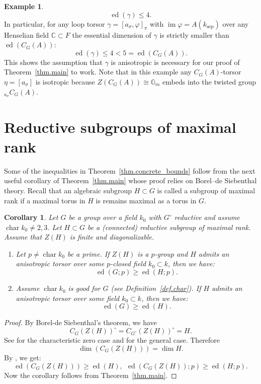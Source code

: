 \documentclass[12pt]{amsart}
\numberwithin{equation}{section}
\newtheorem{corollary}[theorem]{Corollary}
\theoremstyle{definition}
\newtheorem{example}[theorem]{Example}
\newcommand{\bC}{\mathbb{C}}
\newcommand{\Gm}{\mathbb{G}_m}
\newcommand{\im}{\operatorname{im}}
\newcommand{\ed}{\operatorname{ed}}
\newcommand{\sep}{\operatorname{sep}}
\newcommand{\Char}{\operatorname{char}}
\newcommand{\ksep}{k_{\sep}}
\newcommand{\vphi}{\varphi}
\begin{document}
\begin{example}
    $$\ed(\gamma) \leq 4.$$
    In particular, for any loop torsor $\gamma= [a_\sigma,\vphi]_\pi$ with $\im\vphi =A(\ksep)$ over any Henselian field $\bC \subset F$ the essential dimension of $\gamma$ is strictly smaller than $\ed(C_G(A))$:
    $$\ed(\gamma) \leq 4 < 5 = \ed(C_G(A)).$$
    This shows the assumption that $\gamma$ is anisotropic is necessary for our proof of Theorem~\ref{thm.main} to work. Note that in this example any $C_G(A)$-torsor $\eta = [a_\sigma]$ is isotropic because $Z(C_G(A))\cong \Gm$ embeds into the twisted group ${}_{a_\sigma} C_G(A)$. 
\end{example}

\section{Reductive subgroups of maximal rank}\label{sect.pf_of_cor_ofmainthm}

Some of the inequalities in Theorem~\ref{thm.concrete_bounds} follow from the next useful corollary of Theorem~\ref{thm.main} whose proof relies on Borel–de Siebenthal theory. Recall that an algebraic subgroup $H\subset G$ is called a subgroup of maximal rank if a maximal torus in $H$ is remains maximal as a torus in $G$.

\begin{corollary}\label{cor.ofmainthm}
    Let $G$ be a group over a field $k_0$ with $G^{\circ}$ reductive and assume $\Char k_0 \neq 2,3$. Let $H\subset G$ be a (connected) reductive subgroup of maximal rank. Assume that $Z(H)$ is finite and diagonalizable.
     \begin{enumerate}
     
        \item Let $p\neq \Char k_0$ be a prime. If $Z(H)$ is a $p$-group and $H$ admits an anisotropic torsor  over some $p$-closed field $k_0\subset k$, then we have:
        $$\ed(G;p) \geq \ed(H;p).$$
        
        \item Assume $\Char k_0$ is good for $G$ (see Definition~\ref{def.char}). If $H$ admits an anisotropic torsor  over some field $k_0\subset k$, then we have:
        $$\ed(G) \geq \ed(H).$$

    \end{enumerate}
\end{corollary}
\begin{proof}
   By Borel-de Siebenthal's theorem, we have $$C_G(Z(H))^{\circ} = C_{G^{\circ}}(Z(H))^{\circ} =  H.$$ See \cite{borel1949sous} for the characteristic zero case and \cite{pepin2012subgroups} for the general case. Therefore $$\dim(C_G(Z(H))) = \dim H.$$ By \cite[Lemma 2.2]{brv-annals}, we get:
   $$\ed(C_G(Z(H))) \geq \ed(H), \ \ \ed(C_G(Z(H));p) \geq \ed(H;p).$$ 
   Now the corollary follows from Theorem~\ref{thm.main}.
\end{proof}
\end{document}
